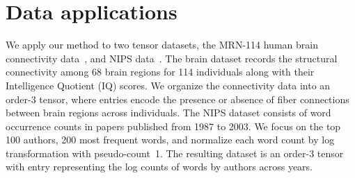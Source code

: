 \documentclass{article}
\theoremstyle{plain}
\theoremstyle{definition}
\begin{document}
\vspace{-.4cm}
\section{Data applications}
\vspace{-.4cm}
We apply our method to two tensor datasets, the MRN-114 human brain connectivity data~\citep{wang2017bayesian}, and NIPS data~\cite{globerson2007euclidean}. The brain dataset records the structural connectivity among 68 brain regions for 114 individuals along with their Intelligence Quotient (IQ) scores. We organize the connectivity data into an order-3 tensor, where entries encode the presence or absence of fiber connections between brain regions across individuals. The NIPS dataset consists of word occurrence counts in papers published from 1987 to 2003. We focus on the top 100 authors, 200 most frequent words, and normalize each word count by log transformation with pseudo-count~1. The resulting dataset is an order-3 tensor with entry representing the log counts of words by authors across years. 


\end{document}
